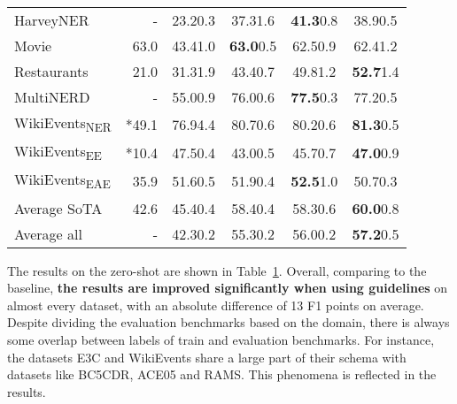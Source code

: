 \documentclass{article} \usepackage{iclr2024_conference,times}
\begin{document}
\begin{table}
\begin{tabular}{l|r|cc|cc}
            HarveyNER & - & 23.2\tiny{0.3} & 37.3\tiny{1.6} & \textbf{41.3}\tiny{0.8} & 38.9\tiny{0.5} \\
            
            Movie & \citep{DBLP:journals/corr/abs-2304-08085} 63.0 & 43.4\tiny{1.0} & \textbf{63.0}\tiny{0.5} & 62.5\tiny{0.9} & 62.4\tiny{1.2} \\
            
            Restaurants & \citep{DBLP:journals/corr/abs-2304-08085} 21.0 & 31.3\tiny{1.9}  & 43.4\tiny{0.7} & 49.8\tiny{1.2} & \textbf{52.7}\tiny{1.4} \\
            
            MultiNERD & - & 55.0\tiny{0.9} & 76.0\tiny{0.6} & \textbf{77.5}\tiny{0.3} & 77.2\tiny{0.5} \\
            
            WikiEvents\textsubscript{NER} & \citep{sainz-etal-2022-zs4ie} *49.1 & 76.9\tiny{4.4} & 80.7\tiny{0.6} & 80.2\tiny{0.6} & \textbf{81.3}\tiny{0.5} \\
            
            WikiEvents\textsubscript{EE} & \citep{sainz-etal-2022-zs4ie} *10.4 & 47.5\tiny{0.4} & 43.0\tiny{0.5} & 45.7\tiny{0.7} & \textbf{47.0}\tiny{0.9} \\
            
            WikiEvents\textsubscript{EAE} & \cite{sainz-etal-2022-textual} 35.9 & 51.6\tiny{0.5} & 51.9\tiny{0.4} & \textbf{52.5}\tiny{1.0} & 50.7\tiny{0.3} \\
            
            \midrule
            Average SoTA & 42.6 & 45.4\tiny{0.4} & 58.4\tiny{0.4} & 58.3\tiny{0.6} & \textbf{60.0}\tiny{0.8} \\
            
            Average all & - & 42.3\tiny{0.2} & 55.3\tiny{0.2} & 56.0\tiny{0.2} & \textbf{57.2}\tiny{0.5} \\
            \bottomrule
        \end{tabular}
\label{tab:zero-results}
\end{table}

The results on the zero-shot are shown in Table~\ref{tab:zero-results}. Overall, comparing to the baseline, \textbf{the results are improved significantly when using guidelines} on almost every dataset, with an absolute difference of 13 F1 points on average. Despite dividing the evaluation benchmarks based on the domain, there is always some overlap between labels of train and evaluation benchmarks. For instance, the datasets E3C and WikiEvents share a large part of their schema with datasets like BC5CDR, ACE05 and RAMS. This phenomena is reflected in the results.
\end{document}
